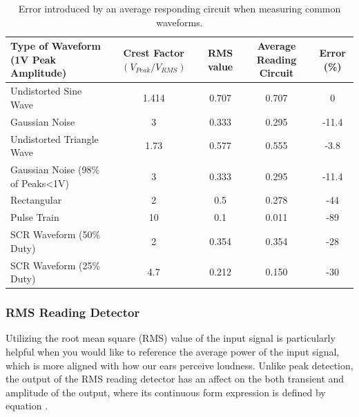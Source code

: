 \documentclass[10pt]{article}
\begin{document}
\begin{multicols*}{2}
                        \begin{table}[!th]
                            \centering
                            \begin{tabularx}{\textwidth}{|l*{4}{|C}|}
                                \hline
                                Type of Waveform (1V Peak Amplitude) & Crest Factor $(V_{Peak}/V_{RMS})$ & RMS value & Average Reading Circuit & Error (\%) \\ \hline
                                Undistorted Sine Wave & 1.414 & 0.707 & 0.707 & 0 \\    \hline
                                Gaussian Noise & 3 & 0.333 & 0.295 & -11.4 \\   \hline
                                Undistorted Triangle Wave & 1.73 & 0.577 & 0.555 & -3.8 \\   \hline
                                Gaussian Noise (98\% of Peaks<1V) & 3 & 0.333 & 0.295 & -11.4 \\    \hline
                                Rectangular & 2 & 0.5 & 0.278 & -44 \\    \hline
                                Pulse Train & 10 & 0.1 & 0.011 & -89 \\    \hline
                                SCR Waveform (50\% Duty) & 2 & 0.354 & 0.354 & -28 \\    \hline
                                SCR Waveform (25\% Duty) & 4.7 & 0.212 & 0.150 & -30 \\    \hline
                            \end{tabularx}
                            \caption{Error introduced by an average responding circuit when measuring common waveforms.}
                            \label{table:ave-err}
                        \end{table} 

                \subsubsection{RMS Reading Detector}
                    Utilizing the root mean square (RMS) value of the input signal is particularly helpful when you would like to reference the average power of the input signal, which is more aligned with how our ears perceive loudness. Unlike peak detection, the output of the RMS reading detector has an affect on the both transient and amplitude of the output, where its continuous form expression is defined by equation \cite{aes-that-rms}.
                    

\end{multicols*}
\end{document}
